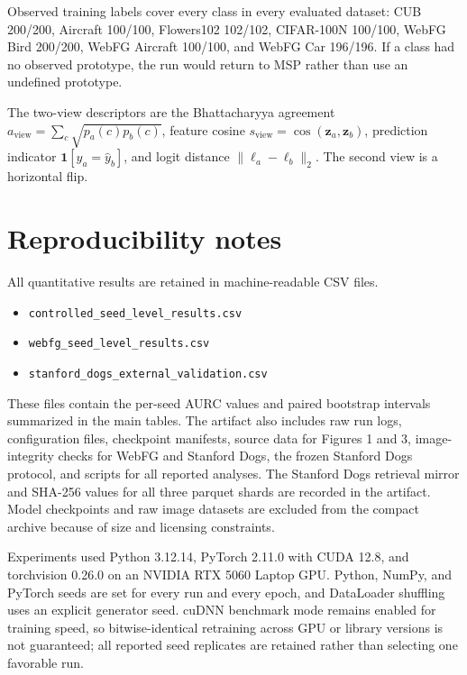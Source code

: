 \documentclass[11pt,a4paper]{article}
\newcommand{\vect}[1]{\mathbf{#1}}
\newcommand{\indicator}{\mathbf{1}}
\begin{document}
Observed training labels cover every class in every evaluated dataset:
CUB 200/200, Aircraft 100/100, Flowers102 102/102, CIFAR-100N 100/100,
WebFG Bird 200/200, WebFG Aircraft 100/100, and WebFG Car 196/196. If a class
had no observed prototype, the run would return to MSP rather than use an
undefined prototype.

The two-view descriptors are the Bhattacharyya agreement
$a_{\mathrm{view}}=\sum_c\sqrt{p_a(c)p_b(c)}$, feature cosine
$s_{\mathrm{view}}=\cos(\vect z_a,\vect z_b)$, prediction indicator
$\indicator[\hat y_a=\hat y_b]$, and logit distance
$\|\vect\ell_a-\vect\ell_b\|_2$. The second view is a horizontal flip.

\section{Reproducibility notes}

All quantitative results are retained in machine-readable CSV files.
\begin{itemize}
  \item \texttt{controlled\_seed\_level\_results.csv}
  \item \texttt{webfg\_seed\_level\_results.csv}
  \item \texttt{stanford\_dogs\_external\_validation.csv}
\end{itemize}
These files contain the per-seed AURC values and paired bootstrap intervals
summarized in the main tables. The artifact also includes raw run logs,
configuration files, checkpoint manifests, source data for Figures 1 and 3,
image-integrity checks for WebFG and Stanford Dogs, the frozen Stanford Dogs
protocol, and scripts for all reported analyses. The Stanford Dogs retrieval
mirror and SHA-256 values for all three parquet shards are recorded in the
artifact. Model checkpoints and raw image datasets are excluded from the
compact archive because of size and licensing constraints.

Experiments used Python 3.12.14, PyTorch 2.11.0 with CUDA 12.8, and
torchvision 0.26.0 on an NVIDIA RTX 5060 Laptop GPU. Python, NumPy, and PyTorch
seeds are set for every run and every epoch, and DataLoader shuffling uses an
explicit generator seed. cuDNN benchmark mode remains enabled for training
speed, so bitwise-identical retraining across GPU or library versions is not
guaranteed; all reported seed replicates are retained rather than selecting one
favorable run.
\end{document}
